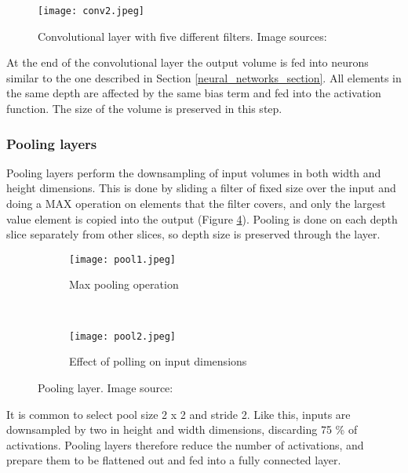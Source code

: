 \begin{figure}[ht] 
    \centering
    \texttt{[image: conv2.jpeg]} 
\caption[Convolutional layer with five different filters.] {Convolutional layer with five different filters. Image sources: \cite{conv_layer_img}\cite{cs231n}}
    \label{conv2}
\end{figure}

At the end of the convolutional layer the output volume is fed into neurons similar to the one described in Section \ref{neural_networks_section}. 
All elements in the same depth are affected by the same bias term and fed into the activation function.
The size of the volume is preserved in this step.

\subsubsection{ Pooling layers}

Pooling layers perform the downsampling of input volumes in both width and height dimensions.
This is done by sliding a filter of fixed size over the input and doing a MAX operation on elements that the filter covers, and only the largest value element is copied into the output (Figure \ref{pool_layer}).
Pooling is done on each depth slice separately from other slices, so depth size is preserved through the layer.

\begin{figure}[ht] 
    \begin{subfigure}[b]{0.5\textwidth}
        \centering
        \texttt{[image: pool1.jpeg]} 
        \caption{Max pooling operation}
        \label{pool1}
    \end{subfigure}
    \unskip\ \vrule\ 
    \begin{subfigure}[b]{0.5\textwidth}
        \centering
        \texttt{[image: pool2.jpeg]} 
        \caption{ Effect of polling on input dimensions}
        \label{pool2}
    \end{subfigure}
    \caption[Polling layer.] {Pooling layer. Image source: \cite{cs231n}}
    \label{pool_layer}
\end{figure}

It is common to select pool size 2 x 2 and stride 2.
Like this, inputs are downsampled by two in height and width dimensions, discarding 75 \% of activations.
Pooling layers therefore reduce the number of activations, and prepare them to be flattened out and fed into a fully connected layer.

